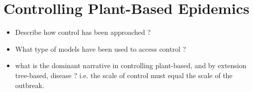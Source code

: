 
\section{Controlling Plant-Based Epidemics}
\begin{itemize}
    \item Describe how control has been approached ?
    \item What type of models have been used to access control ? \cite{WEBIDEMICS} \cite{large-scale-control}
    \item what is the dominant narrative in controlling plant-based, and by extension tree-based, disease ? i.e. the scale of control must equal the scale of the outbreak.
\end{itemize}

